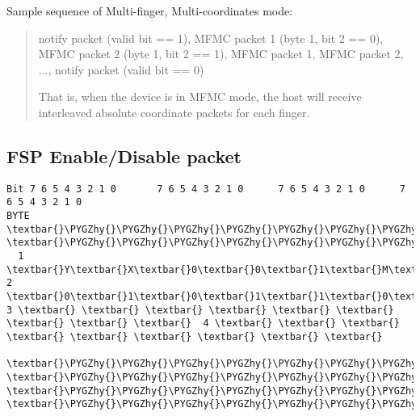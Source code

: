 \documentclass[a4paper,8pt,english]{sphinxmanual}
\def\PYGZhy{\char`\-}
\begin{document}
Sample sequence of Multi-finger, Multi-coordinates mode:
\begin{quote}

notify packet (valid bit == 1), MFMC packet 1 (byte 1, bit 2 == 0),
MFMC packet 2 (byte 1, bit 2 == 1), MFMC packet 1, MFMC packet 2,
..., notify packet (valid bit == 0)

That is, when the device is in MFMC mode, the host will receive
interleaved absolute coordinate packets for each finger.
\end{quote}


\subsection{FSP Enable/Disable packet}
\label{input/devices/sentelic:fsp-enable-disable-packet}
\begin{Verbatim}[commandchars=\\\{\}]
Bit 7 6 5 4 3 2 1 0       7 6 5 4 3 2 1 0      7 6 5 4 3 2 1 0      7 6 5 4 3 2 1 0
BYTE  \textbar{}\PYGZhy{}\PYGZhy{}\PYGZhy{}\PYGZhy{}\PYGZhy{}\PYGZhy{}\PYGZhy{}\PYGZhy{}\PYGZhy{}\PYGZhy{}\PYGZhy{}\PYGZhy{}\PYGZhy{}\PYGZhy{}\PYGZhy{}\textbar{}BYTE \textbar{}\PYGZhy{}\PYGZhy{}\PYGZhy{}\PYGZhy{}\PYGZhy{}\PYGZhy{}\PYGZhy{}\PYGZhy{}\PYGZhy{}\PYGZhy{}\PYGZhy{}\PYGZhy{}\PYGZhy{}\PYGZhy{}\PYGZhy{}\textbar{}BYTE\textbar{}\PYGZhy{}\PYGZhy{}\PYGZhy{}\PYGZhy{}\PYGZhy{}\PYGZhy{}\PYGZhy{}\PYGZhy{}\PYGZhy{}\PYGZhy{}\PYGZhy{}\PYGZhy{}\PYGZhy{}\PYGZhy{}\PYGZhy{}\textbar{}BYTE\textbar{}\PYGZhy{}\PYGZhy{}\PYGZhy{}\PYGZhy{}\PYGZhy{}\PYGZhy{}\PYGZhy{}\PYGZhy{}\PYGZhy{}\PYGZhy{}\PYGZhy{}\PYGZhy{}\PYGZhy{}\PYGZhy{}\PYGZhy{}\textbar{}
  1   \textbar{}Y\textbar{}X\textbar{}0\textbar{}0\textbar{}1\textbar{}M\textbar{}R\textbar{}L\textbar{}  2  \textbar{}0\textbar{}1\textbar{}0\textbar{}1\textbar{}1\textbar{}0\textbar{}1\textbar{}E\textbar{}  3 \textbar{} \textbar{} \textbar{} \textbar{} \textbar{} \textbar{} \textbar{} \textbar{} \textbar{}  4 \textbar{} \textbar{} \textbar{} \textbar{} \textbar{} \textbar{} \textbar{} \textbar{} \textbar{}
      \textbar{}\PYGZhy{}\PYGZhy{}\PYGZhy{}\PYGZhy{}\PYGZhy{}\PYGZhy{}\PYGZhy{}\PYGZhy{}\PYGZhy{}\PYGZhy{}\PYGZhy{}\PYGZhy{}\PYGZhy{}\PYGZhy{}\PYGZhy{}\textbar{}     \textbar{}\PYGZhy{}\PYGZhy{}\PYGZhy{}\PYGZhy{}\PYGZhy{}\PYGZhy{}\PYGZhy{}\PYGZhy{}\PYGZhy{}\PYGZhy{}\PYGZhy{}\PYGZhy{}\PYGZhy{}\PYGZhy{}\PYGZhy{}\textbar{}    \textbar{}\PYGZhy{}\PYGZhy{}\PYGZhy{}\PYGZhy{}\PYGZhy{}\PYGZhy{}\PYGZhy{}\PYGZhy{}\PYGZhy{}\PYGZhy{}\PYGZhy{}\PYGZhy{}\PYGZhy{}\PYGZhy{}\PYGZhy{}\textbar{}    \textbar{}\PYGZhy{}\PYGZhy{}\PYGZhy{}\PYGZhy{}\PYGZhy{}\PYGZhy{}\PYGZhy{}\PYGZhy{}\PYGZhy{}\PYGZhy{}\PYGZhy{}\PYGZhy{}\PYGZhy{}\PYGZhy{}\PYGZhy{}\textbar{}


\end{Verbatim}
\end{document}
